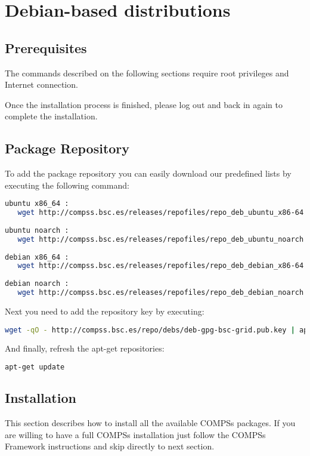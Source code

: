 \section{Debian-based distributions}
\label{sec:Debian}


\subsection{Prerequisites}
The commands described on the following sections require root privileges and Internet connection.

Once the installation process is finished, please log out and back in again to complete the installation. 

\subsection{Package Repository}
To add the package repository you can easily download our predefined lists by executing the following command:
\begin{lstlisting}[language=bash]
ubuntu x86_64 :
   wget http://compss.bsc.es/releases/repofiles/repo_deb_ubuntu_x86-64.list -O /etc/apt/sources.list.d/compss-framework_x86-64.list
   
ubuntu noarch :
   wget http://compss.bsc.es/releases/repofiles/repo_deb_ubuntu_noarch.list -O /etc/apt/sources.list.d/compss-framework_noarch.list
   
debian x86_64 :
   wget http://compss.bsc.es/releases/repofiles/repo_deb_debian_x86-64.list -O /etc/apt/sources.list.d/compss-framework_x86-64.list
   
debian noarch :
   wget http://compss.bsc.es/releases/repofiles/repo_deb_debian_noarch.list -O /etc/apt/sources.list.d/compss-framework_noarch.list
\end{lstlisting}

Next you need to add the repository key by executing:
\begin{lstlisting}[language=bash]
wget -qO - http://compss.bsc.es/repo/debs/deb-gpg-bsc-grid.pub.key | apt-key add -
\end{lstlisting}

And finally, refresh the apt-get repositories:
\begin{lstlisting}[language=bash]
apt-get update
\end{lstlisting}

\subsection{Installation}
This section describes how to install all the available COMPSs packages. If you are willing to have a full COMPSs installation 
just follow the COMPSs Framework instructions and skip directly to next section.


